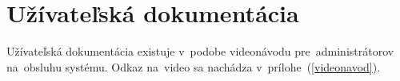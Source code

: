 \chapter{Užívateľská dokumentácia}

Užívateľská dokumentácia existuje v~podobe videonávodu pre~administrátorov na~obsluhu systému. Odkaz na~video sa nachádza v~prílohe~(\ref{videonavod}).
